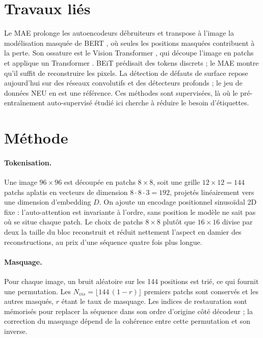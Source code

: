 \documentclass[twocolumn,10pt,a4paper]{article}
\begin{document}
\section{Travaux liés}

Le MAE prolonge les autoencodeurs débruiteurs \cite{vincent2010dae} et transpose à l'image la
modélisation masquée de BERT \cite{devlin2019bert}, où seules les positions masquées contribuent à
la perte. Son ossature est le Vision Transformer \cite{dosovitskiy2021vit}, qui découpe l'image en
patchs et applique un Transformer \cite{vaswani2017attention}. BEiT \cite{bao2021beit} prédisait des
tokens discrets ; le MAE montre qu'il suffit de reconstruire les pixels. La détection de défauts de
surface repose aujourd'hui sur des réseaux convolutifs et des détecteurs profonds
\cite{bhatt2021,tang2023} ; le jeu de données NEU \cite{song2013,he2020} en est une référence. Ces
méthodes sont supervisées, là où le pré-entraînement auto-supervisé étudié ici cherche à réduire le
besoin d'étiquettes.

\section{Méthode}

\paragraph{Tokenisation.}
Une image $96\times 96$ est découpée en patchs $8\times 8$, soit une grille $12\times 12 = 144$
patchs aplatis en vecteurs de dimension $8\cdot 8\cdot 3 = 192$, projetés linéairement vers une
dimension d'embedding $D$. On ajoute un encodage positionnel sinusoïdal 2D fixe : l'auto-attention
est invariante à l'ordre, sans position le modèle ne sait pas où se situe chaque patch. Le choix de
patchs $8\times 8$ plutôt que $16\times 16$ divise par deux la taille du bloc reconstruit et réduit
nettement l'aspect en damier des reconstructions, au prix d'une séquence quatre fois plus longue.

\paragraph{Masquage.}
Pour chaque image, un bruit aléatoire sur les 144 positions est trié, ce qui fournit une
permutation. Les $N_{vis} = \lfloor 144\,(1-r)\rfloor$ premiers patchs sont conservés et les autres
masqués, $r$ étant le taux de masquage. Les indices de restauration sont mémorisés pour replacer la
séquence dans son ordre d'origine côté décodeur ; la correction du masquage dépend de la cohérence
entre cette permutation et son inverse.
\end{document}

